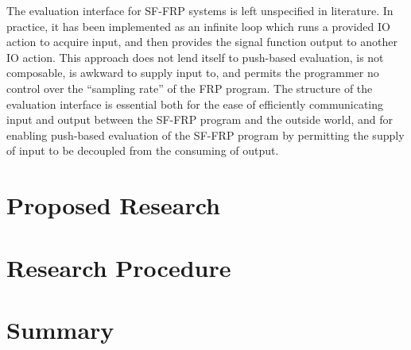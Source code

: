 \documentclass[11pt]{artikel3}
\begin{document}
The evaluation interface for SF-FRP systems is left unspecified in
literature. In practice, it has been implemented as an infinite loop
which runs a provided IO action to acquire input, and then provides
the signal function output to another IO action. This approach does
not lend itself to push-based evaluation, is not composable, is
awkward to supply input to, and permits the programmer no control
over the ``sampling rate'' of the FRP program. The structure of the
evaluation interface is essential both for the ease of efficiently
communicating input and output between the SF-FRP program and the
outside world, and for enabling push-based evaluation of the SF-FRP
program by permitting the supply of input to be decoupled from the
consuming of output.

\section{Proposed Research}

\section{Research Procedure}

\section{Summary}

{}

\end{document}
